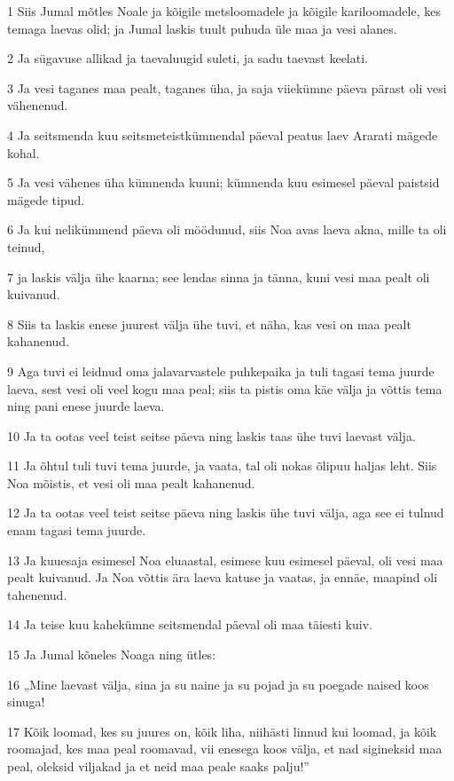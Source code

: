 \par 1 Siis Jumal mõtles Noale ja kõigile metsloomadele ja kõigile kariloomadele, kes temaga laevas olid; ja Jumal laskis tuult puhuda üle maa ja vesi alanes.
\par 2 Ja sügavuse allikad ja taevaluugid suleti, ja sadu taevast keelati.
\par 3 Ja vesi taganes maa pealt, taganes üha, ja saja viiekümne päeva pärast oli vesi vähenenud.
\par 4 Ja seitsmenda kuu seitsmeteistkümnendal päeval peatus laev Ararati mägede kohal.
\par 5 Ja vesi vähenes üha kümnenda kuuni; kümnenda kuu esimesel päeval paistsid mägede tipud.
\par 6 Ja kui nelikümmend päeva oli möödunud, siis Noa avas laeva akna, mille ta oli teinud,
\par 7 ja laskis välja ühe kaarna; see lendas sinna ja tänna, kuni vesi maa pealt oli kuivanud.
\par 8 Siis ta laskis enese juurest välja ühe tuvi, et näha, kas vesi on maa pealt kahanenud.
\par 9 Aga tuvi ei leidnud oma jalavarvastele puhkepaika ja tuli tagasi tema juurde laeva, sest vesi oli veel kogu maa peal; siis ta pistis oma käe välja ja võttis tema ning pani enese juurde laeva.
\par 10 Ja ta ootas veel teist seitse päeva ning laskis taas ühe tuvi laevast välja.
\par 11 Ja õhtul tuli tuvi tema juurde, ja vaata, tal oli nokas õlipuu haljas leht. Siis Noa mõistis, et vesi oli maa pealt kahanenud.
\par 12 Ja ta ootas veel teist seitse päeva ning laskis ühe tuvi välja, aga see ei tulnud enam tagasi tema juurde.
\par 13 Ja kuuesaja esimesel Noa eluaastal, esimese kuu esimesel päeval, oli vesi maa pealt kuivanud. Ja Noa võttis ära laeva katuse ja vaatas, ja ennäe, maapind oli tahenenud.
\par 14 Ja teise kuu kahekümne seitsmendal päeval oli maa täiesti kuiv.
\par 15 Ja Jumal kõneles Noaga ning ütles:
\par 16 „Mine laevast välja, sina ja su naine ja su pojad ja su poegade naised koos sinuga!
\par 17 Kõik loomad, kes su juures on, kõik liha, niihästi linnud kui loomad, ja kõik roomajad, kes maa peal roomavad, vii enesega koos välja, et nad sigineksid maa peal, oleksid viljakad ja et neid maa peale saaks palju!”
